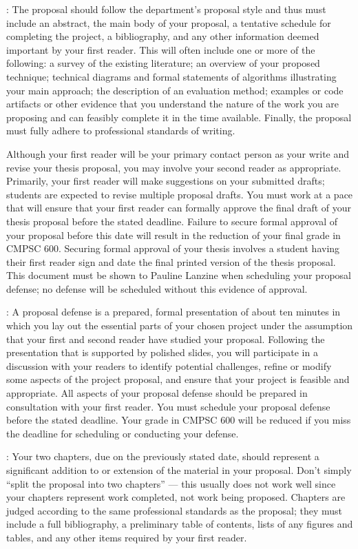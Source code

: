 : The proposal should follow the department's proposal style and thus must include an
abstract, the main body of your proposal, a tentative schedule for completing the project, a bibliography, and any other
information deemed important by your first reader. This will often include one or more of the following: a survey of the
existing literature; an overview of your proposed technique; technical diagrams and formal statements of algorithms
illustrating your main approach; the description of an evaluation method; examples or code artifacts or other evidence that
you understand the nature of the work you are proposing and can feasibly complete it in the time available.  Finally, the
proposal must fully adhere to professional standards of writing.

Although your first reader will be your primary contact person as your write and revise your thesis proposal, you may
involve your second reader as appropriate. Primarily, your first reader will make suggestions on your submitted drafts;
students are expected to revise multiple proposal drafts.  You must work at a pace that will ensure that your first
reader can formally approve the final draft of your thesis proposal before the stated deadline.  Failure to secure
formal approval of your proposal before this date will result in the reduction of your final grade in CMPSC 600.
Securing formal approval of your thesis involves a student having their first reader sign and date the final printed
version of the thesis proposal. This document must be shown to Pauline Lanzine when scheduling your proposal defense; no
defense will be scheduled without this evidence of approval.

: A proposal defense is a prepared, formal presentation of about ten minutes in which you
lay out the essential parts of your chosen project under the assumption that your first and second reader have studied
your proposal.  Following the presentation that is supported by polished slides, you will participate in a discussion
with your readers to identify potential challenges, refine or modify some aspects of the project proposal, and ensure that
your project is feasible and appropriate. All aspects of your proposal defense should be prepared in consultation with
your first reader.  You must schedule your proposal defense before the stated deadline. Your grade in CMPSC 600 will be
reduced if you miss the deadline for scheduling or conducting your defense.

: Your two chapters, due on the previously stated date, should represent a significant
addition to or extension of the material in your proposal. Don't simply ``split the proposal into two chapters'' ---
this usually does not work well since your chapters represent work completed, not work being proposed.  Chapters are
judged according to the same professional standards as the proposal; they must include a full bibliography, a
preliminary table of contents, lists of any figures and tables, and any other items required by your first reader.

